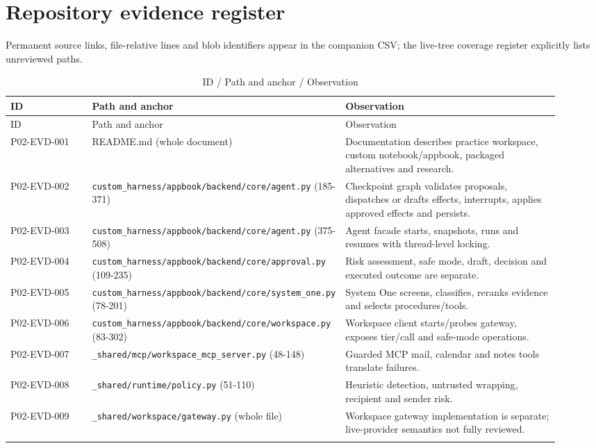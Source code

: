 \documentclass[10pt,letterpaper]{article}
\begin{document}
\section{Repository evidence register}
Permanent source links, file-relative lines and blob identifiers appear in the companion CSV; the live-tree coverage register explicitly lists unreviewed paths.
\begin{longtable}{@{}>{\raggedright\arraybackslash}p{0.16\linewidth}>{\raggedright\arraybackslash}p{0.34\linewidth}>{\raggedright\arraybackslash}p{0.42\linewidth}@{}}
\caption{ID / Path and anchor / Observation}\\
\toprule ID & Path and anchor & Observation\\\midrule\endfirsthead
\toprule ID & Path and anchor & Observation\\\midrule\endhead
P02-EVD-001 & README.md (whole document) & Documentation describes practice workspace, custom notebook/appbook, packaged alternatives and research.\\\addlinespace
P02-EVD-002 & \nolinkurl{custom_harness/appbook/backend/core/agent.py} (185-371) & Checkpoint graph validates proposals, dispatches or drafts effects, interrupts, applies approved effects and persists.\\\addlinespace
P02-EVD-003 & \nolinkurl{custom_harness/appbook/backend/core/agent.py} (375-508) & Agent facade starts, snapshots, runs and resumes with thread-level locking.\\\addlinespace
P02-EVD-004 & \nolinkurl{custom_harness/appbook/backend/core/approval.py} (109-235) & Risk assessment, safe mode, draft, decision and executed outcome are separate.\\\addlinespace
P02-EVD-005 & \nolinkurl{custom_harness/appbook/backend/core/system_one.py} (78-201) & System One screens, classifies, reranks evidence and selects procedures/tools.\\\addlinespace
P02-EVD-006 & \nolinkurl{custom_harness/appbook/backend/core/workspace.py} (83-302) & Workspace client starts/probes gateway, exposes tier/call and safe-mode operations.\\\addlinespace
P02-EVD-007 & \nolinkurl{_shared/mcp/workspace_mcp_server.py} (48-148) & Guarded MCP mail, calendar and notes tools translate failures.\\\addlinespace
P02-EVD-008 & \nolinkurl{_shared/runtime/policy.py} (51-110) & Heuristic detection, untrusted wrapping, recipient and sender risk.\\\addlinespace
P02-EVD-009 & \nolinkurl{_shared/workspace/gateway.py} (whole file) & Workspace gateway implementation is separate; live-provider semantics not fully reviewed.\\\addlinespace

\end{longtable}
\end{document}
